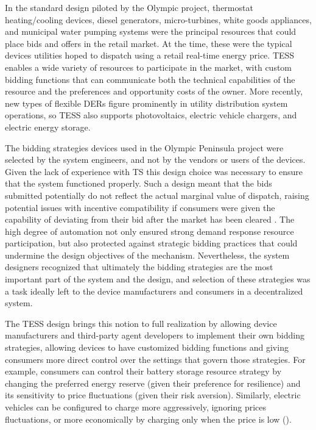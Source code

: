 In the standard design piloted by the Olympic project, thermostat heating/cooling devices, diesel generators, micro-turbines, white goods appliances, and municipal water pumping systems were the principal resources that could place bids and offers in the retail market.  At the time, these were the typical devices utilities hoped to dispatch using a retail real-time energy price. 
TESS enables a wide variety of resources to participate in the market, with custom bidding functions that can communicate both the technical capabilities of the resource and the preferences and opportunity costs of the owner.
More recently, new types of flexible DERs figure prominently in utility distribution system operations, so TESS also supports photovoltaics, electric vehicle chargers, and electric energy storage.

The bidding strategies devices used in the Olympic Peninsula project were selected by the system engineers, and not by the vendors or users of the devices. Given the lack of experience with TS this design choice was necessary to ensure that the system functioned properly. 
Such a design meant that the bids submitted potentially do not reflect the actual marginal value of dispatch, raising potential issues with incentive compatibility if consumers were given the capability of deviating from their bid after the market has been cleared \citep{lian_transactive_2020}. 
The high degree of automation not only ensured strong demand response resource participation, but also protected against strategic bidding practices that could undermine the design objectives of the mechanism.
Nevertheless, the system designers recognized that ultimately the bidding strategies are the most important part of the system and the design, and selection of these strategies was a task ideally left to the device manufacturers and consumers in a decentralized system.

The TESS design brings this notion to full realization by allowing device manufacturers and third-party agent developers to implement their own bidding strategies, allowing devices to have customized bidding functions and giving consumers more direct control over the settings that govern those strategies. For example, consumers can control their battery storage resource strategy by changing the preferred energy reserve (given their preference for resilience) and its sensitivity to price fluctuations (given their risk aversion). Similarly, electric vehicles can be configured to charge more aggressively, ignoring prices fluctuations, or more economically by charging only when the price is low (\cite{behboodi_electric_2016}). 

